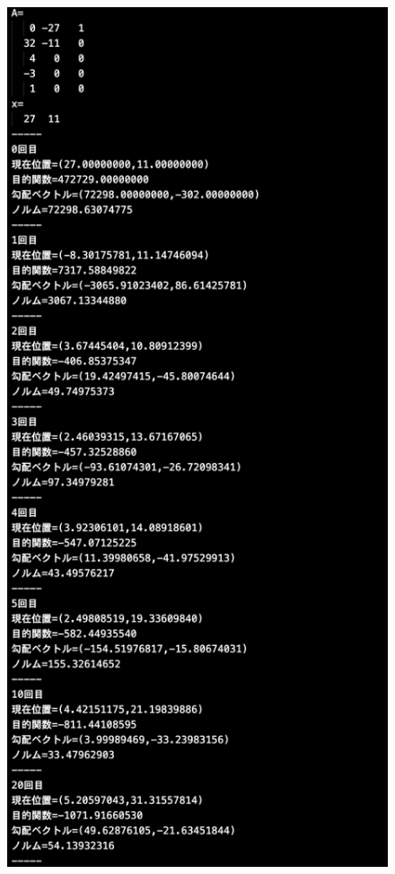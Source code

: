 \documentclass[12pt]{jarticle}
\begin{document}
\clearpage
\begin{figure}[h]
    \begin{center}
        \includegraphics[scale=0.2]{kadai1_2s_out1_3_1.png}
    \end{center}

\end{figure}
\end{document}
